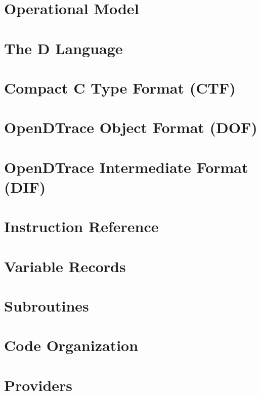 \chapter{Operational Model}
\label{chap:opendtrace-operation}


\chapter{The D Language}
\label{chap:opendtrace-dlang}


\chapter{Compact C Type Format (CTF)}
\label{chap:opendtrace-ctf}


\chapter{OpenDTrace Object Format (DOF)}
\label{chap:opendtrace-object-format}


\chapter{OpenDTrace Intermediate Format (DIF)}
\label{chap:opendtrace-intermediate-format}


\chapter{Instruction Reference}
\label{chap:opendtrace-instruction-reference}


\chapter{Variable Records}
\label{chap:opendtrace-variable-records}


\chapter{Subroutines}
\label{chap:opendtrace-subroutines}


\begin{appendices}
\chapter{Code Organization}
\label{chap:opendtrace-code}


\chapter{Providers}
\label{chap:opendtrace-providers}


\end{appendices}






